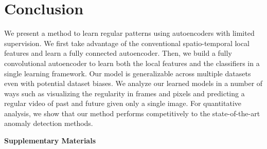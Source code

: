 \documentclass[10pt,twocolumn,letterpaper]{article}
\begin{document}
 

\section{Conclusion}
\label{sec:conclusion}

We present a method to learn regular patterns using autoencoders with limited supervision.
We first take advantage of the conventional spatio-temporal local features and learn a fully connected autoencoder.
Then, we build a fully convolutional autoencoder to learn both the local features and the classifiers in a single learning framework.
Our model is generalizable across multiple datasets even with potential dataset biases.
We analyze our learned models in a number of ways such as visualizing the regularity in frames and pixels and predicting a regular video of past and future given only a single image. 
For quantitative analysis, we show that our method performs competitively to the state-of-the-art anomaly detection methods. 
{
\small


}

\clearpage
\onecolumn

\begin{center} 
{\bf \Large Supplementary Materials}
\end{center}
\vspace{1em}
\end{document}
